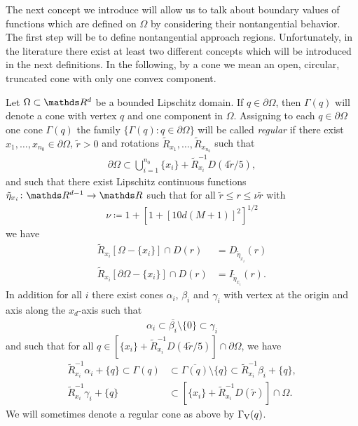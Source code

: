 The next concept we introduce will allow us to talk about boundary values of functions which are defined on $\Omega$ by considering their nontangential behavior.
The first step will be to define nontangential approach regions.
Unfortunately, in the literature there exist at least two different concepts which will be introduced in the next definitions.
  In the following, by a cone we mean an open, circular, truncated cone with only one convex component.

\begin{defn}
  \label{defn:regularFamilyOfCones}
  Let $\Omega \subset \R^d$ be a bounded Lipschitz domain.
  If $q \in \partial\Omega$, then $\Gamma(q)$ will denote a cone with vertex $q$ and one component in $\Omega$.
  Assigning to each $q \in \partial\Omega$ one cone $\Gamma(q)$ the family $\{ \Gamma(q) \colon q \in \partial\Omega \}$ will be called \emph{regular} if there exist $x_1, \dots,x_{n_0} \in \partial\Omega$, $\tilde r > 0$ and rotations $\tilde R_{x_1}, \dots, \tilde R_{x_{n_0}}$ such that
  \begin{align*}
    \partial\Omega \subset \bigcup_{i = 1}^{n_0} \{ x_i \} + \tilde R_{x_i}^{-1} D(4 \tilde r / 5),
  \end{align*}
  and such that there exist Lipschitz continuous functions $\tilde \eta_{x_i} \colon \R^{d - 1} \to \R$ such that for all $\tilde r \leq r \leq \nu \tilde r$ with 
  \begin{align*}
    \nu \coloneqq 1 + [ 1 + [10 d(M + 1)]^2]^{1/2}
  \end{align*}
  we have
  \begin{align*}
    \tilde R_{x_i}[\Omega - \{x_i\}] \cap D(r) &= D_{\tilde \eta_{x_i}}(r) \\
    \tilde R_{x_i}[\partial\Omega - \{x_i\}] \cap D(r) &= I_{\tilde \eta_{x_i}}(r).
  \end{align*}
  In addition for all $i$ there exist cones $\alpha_i$, $\beta_i$ and $\gamma_i$ with vertex at the origin and axis along the $x_d$-axis such that
  \begin{align*}
    \alpha_i \subset \overline{\beta_i} \setminus\{0\} \subset \gamma_i
  \end{align*}
  and such that for all $q \in [ \{ x_i\} + \tilde R_{x_i}^{-1} D(4 \tilde r / 5)] \cap \partial\Omega$, we have
  \begin{align*}
    \tilde R_{x_i}^{-1} \alpha_i + \{ q\} \subset \Gamma(q) &\subset \overline{\Gamma(q)} \setminus \{q\} \subset \tilde R_{x_i}^{-1} \beta_i + \{ q\}, \\
    \tilde R_{x_i}^{-1} \gamma_i + \{q\} &\subset [\{ x_i\} + \tilde R_{x_i}^{-1} D(\tilde r)] \cap \Omega.
  \end{align*}
  We will sometimes denote a regular cone as above by $\Gamma_\mathrm{V}(q)$.
\end{defn}

